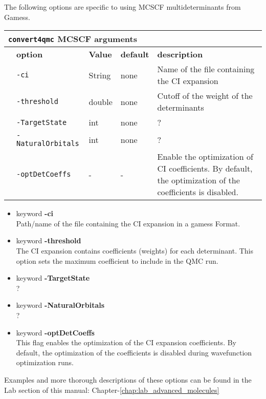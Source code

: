 The following options are specific to using MCSCF multideterminants from Gamess. 

 \begin{table}[h]
 \begin{center}
 \begin{tabularx}{\textwidth}{l l l l l }
 \hline
 \multicolumn{5}{l}{\texttt{convert4qmc} MCSCF arguments} \\
 \hline
    &   \bfseries option      & \bfseries Value & \bfseries default   & \bfseries description \\
    &   \texttt{-ci    } & String     &   none & Name of the file containing the CI expansion  \\
    &   \texttt{-threshold         } &  double    &  none & Cutoff of the weight of the determinants  \\
    &   \texttt{-TargetState      } & int  &  none & ?  \\
    &   \texttt{-NaturalOrbitals      } &  int      &  none   & ?  \\
    &   \texttt{-optDetCoeffs      } &  -      &   - & Enable the optimization of CI coefficients. By default, the optimization of the coefficients is disabled. \\
    \hline
     \end{tabularx}
 \end{center}
 \end{table}
\begin{itemize}
\item keyword \textbf{-ci}\\
Path/name of the file containing the CI expansion in a gamess Format.
\item keyword \textbf{-threshold}\\
The CI expansion contains coefficients (weights) for each determinant. This option sets the maximum coefficient to include in the QMC run. 
\item keyword \textbf{-TargetState}\\
?
\item keyword \textbf{-NaturalOrbitals}\\
?
\item keyword \textbf{-optDetCoeffs}\\
This flag enables the optimization of the CI expansion coefficients. By default, the optimization of the coefficients is disabled during wavefunction optimization runs. 
\end{itemize}

Examples and more thorough descriptions of these options can be found in the Lab section of this manual: Chapter-\ref{chap:lab_advanced_molecules}\\

